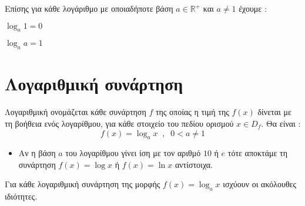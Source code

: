 Επίσης για κάθε λογάριθμο με οποιαδήποτε βάση $ a\in\mathbb{R}^+ $ και $ a\neq1 $ έχουμε :
\begin{multicols}{2}
\begin{rlist}
\item $ \log_{a}1=0 $
\item $ \log_{a}a=1 $
\end{rlist}
\end{multicols}
\section{Λογαριθμική συνάρτηση}
\orismoi
{}
Λογαριθμική ονομάζεται κάθε συνάρτηση $ f $ της οποίας η τιμή της $ f(x) $ δίνεται με τη βοήθεια ενός λογαρίθμου, για κάθε στοιχείο του πεδίου ορισμού $ x\in D_f $. Θα είναι :
\[ f(x)=\log_ax\;\;,\;\;0<a\neq1 \]
\begin{itemize}
\item Αν η βάση $ a $ του λογαρίθμου γίνει ίση με τον αριθμό $ 10 $ ή $ e $ τότε αποκτάμε τη συνάρτηση $ f(x)=\log{x} $ ή $ f(x)=\ln{x} $ αντίστοιχα.
\end{itemize}
\thewrhmata
{}
Για κάθε λογαριθμική συνάρτηση της μορφής $ f(x)=\log_{a}{x} $ ισχύουν οι ακόλουθες ιδιότητες.
